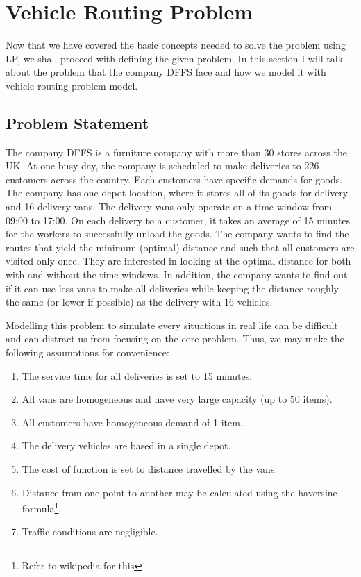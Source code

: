\chapter{Vehicle Routing Problem}
Now that we have covered the basic concepts needed to solve the problem using LP, we shall proceed with
defining the given problem. In this section I will talk about the problem that the company DFFS face and how
we model it with vehicle routing problem model.

\section{Problem Statement}
The company DFFS is a furniture company with more than 30 stores across the UK. At one busy day, the company is scheduled to
make deliveries to 226 customers across the country. Each customers have specific demands for goods. The company has
one depot location, where it stores all of its goods for delivery and 16 delivery vans. The delivery vans only operate on
a time window from 09:00 to 17:00. On each delivery to a customer, it takes an average of 15 minutes for the workers to successfully unload the goods.
The company wants to find the routes that yield the minimum (optimal) distance and such that all customers are visited only once. They are interested
in looking at the optimal distance for both with and without the time windows.
In addition, the company wants to find out if it can use less vans to make all deliveries while keeping the distance roughly the same (or lower if possible) as
the delivery with 16 vehicles.

Modelling this problem to simulate every situations in real life can be difficult and can distract us from focusing on the core problem.
Thus, we may make the following assumptions for convenience:
\begin{enumerate}
\item The service time for all deliveries is set to 15 minutes.
\item All vans are homogeneous and have very large capacity (up to 50 items).
\item All customers have homogeneous demand of 1 item.
\item The delivery vehicles are based in a single depot.
\item The cost of function is set to distance travelled by the vans.
\item Distance from one point to another may be calculated using the haversine formula\footnote{Refer to wikipedia for this}.
\item Traffic conditions are negligible.
\end{enumerate}

